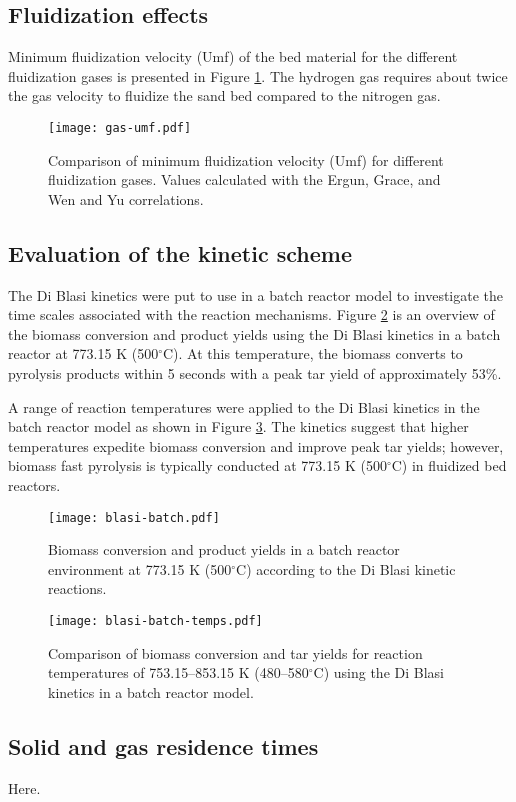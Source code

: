 \subsection{Fluidization effects}

Minimum fluidization velocity (Umf) of the bed material for the different fluidization gases is presented in Figure \ref{fig:gas-umf}. The hydrogen gas requires about twice the gas velocity to fluidize the sand bed compared to the nitrogen gas.

\begin{figure}[H]
    \centering
    \texttt{[image: gas-umf.pdf]}
    \caption{Comparison of minimum fluidization velocity (Umf) for different fluidization gases. Values calculated with the Ergun, Grace, and Wen and Yu correlations.}
    \label{fig:gas-umf}
\end{figure}

\subsection{Evaluation of the kinetic scheme}

The Di Blasi kinetics were put to use in a batch reactor model to investigate the time scales associated with the reaction mechanisms. Figure \ref{fig:blasi-batch} is an overview of the biomass conversion and product yields using the Di Blasi kinetics in a batch reactor at 773.15 K (500$^\circ$C). At this temperature, the biomass converts to pyrolysis products within 5 seconds with a peak tar yield of approximately 53\%.

A range of reaction temperatures were applied to the Di Blasi kinetics in the batch reactor model as shown in Figure \ref{fig:blasi-batch-temps}. The kinetics suggest that higher temperatures expedite biomass conversion and improve peak tar yields; however, biomass fast pyrolysis is typically conducted at 773.15 K (500$^\circ$C) in fluidized bed reactors.

\begin{figure}[H]
    \centering
    \texttt{[image: blasi-batch.pdf]}
    \caption{Biomass conversion and product yields in a batch reactor environment at 773.15 K (500$^\circ$C) according to the Di Blasi kinetic reactions.}
    \label{fig:blasi-batch}
\end{figure}

\begin{figure}[H]
    \centering
    \texttt{[image: blasi-batch-temps.pdf]}
    \caption{Comparison of biomass conversion and tar yields for reaction temperatures of 753.15--853.15 K (480--580$^\circ$C) using the Di Blasi kinetics in a batch reactor model.}
    \label{fig:blasi-batch-temps}
\end{figure}

\subsection{Solid and gas residence times}

Here.
